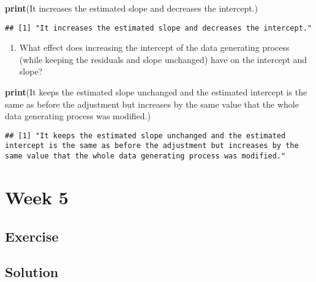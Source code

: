 \documentclass[
]{book}
\newenvironment{Shaded}{\begin{snugshade}}{\end{snugshade}}
\newcommand{\FunctionTok}[1]{\textcolor[rgb]{0.13,0.29,0.53}{\textbf{#1}}}
\newcommand{\NormalTok}[1]{#1}
\newcommand{\StringTok}[1]{\textcolor[rgb]{0.31,0.60,0.02}{#1}}
\providecommand{\tightlist}{%
  \setlength{\itemsep}{0pt}\setlength{\parskip}{0pt}}
\begin{document}
\begin{Shaded}
\begin{Highlighting}[]
\FunctionTok{print}\NormalTok{(}\StringTok{\textquotesingle{}It increases the estimated slope and decreases the intercept.\textquotesingle{}}\NormalTok{)}
\end{Highlighting}
\end{Shaded}

\begin{verbatim}
## [1] "It increases the estimated slope and decreases the intercept."
\end{verbatim}

\begin{enumerate}
\def\labelenumi{\roman{enumi}.}
\setcounter{enumi}{3}
\tightlist
\item
  What effect does increasing the intercept of the data generating process (while keeping the residuals and slope unchanged) have on the intercept and slope?
\end{enumerate}

\begin{Shaded}
\begin{Highlighting}[]
\FunctionTok{print}\NormalTok{(}\StringTok{\textquotesingle{}It keeps the estimated slope unchanged and the estimated intercept is the same as before the adjustment but increases by the same value that the whole data generating process was modified.\textquotesingle{}}\NormalTok{)}
\end{Highlighting}
\end{Shaded}

\begin{verbatim}
## [1] "It keeps the estimated slope unchanged and the estimated intercept is the same as before the adjustment but increases by the same value that the whole data generating process was modified."
\end{verbatim}

\hypertarget{week-5}{%
\chapter{Week 5}\label{week-5}}

\hypertarget{exercise-1}{%
\section{Exercise}\label{exercise-1}}

\hypertarget{solution-2}{%
\section{Solution}\label{solution-2}}
\end{document}
